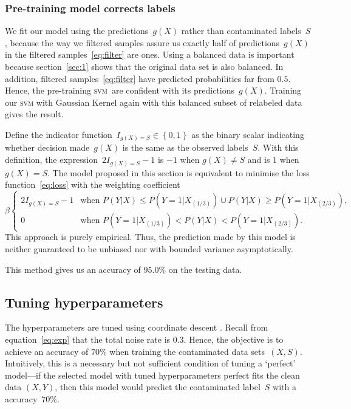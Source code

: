\documentclass[12pt]{article} %
\newcommand{\svm}{\textsc{svm}}
\begin{document}
\subsubsection{Pre-training model corrects labels}
We fit our model using the predictions~$g(X)$ rather than contaminated labels~$S$, because the way we filtered samples  assure us exactly half of predictions~$g(X)$ in the filtered samples~\eqref{eq:filter}  are ones.
Using a balanced data is important because section~\ref{sec:1} shows that the original data set is also balanced. In addition, filtered samples~\eqref{eq:filter} have  predicted probabilities far from $0.5$. Hence, the pre-training \svm\ are confident with its predictions~$g(X)$.
Training our \textsc{svm} with Gaussian Kernel again with this balanced subset of relabeled data gives the result.

Define the indicator function~$I_{g(X)=S} \in \left\{0,1\right\}$ as the binary scalar indicating whether decision made~$g(X)$ is the same as the observed labels~$S$. With this definition, the expression~$2I_{g(X)=S}-1$ is $-1$ when $g(X)\neq S$ and is $1$ when $g(X)=S$.  The model proposed in this section is equivalent to minimise the loss function~\eqref{eq:loss} with the weighting coefficient
\begin{equation*}
\beta\begin{cases}
2I_{g(X)=S}-1 & \text{when }P({Y}|X)\leq P(Y=1|X_{(1/3)}) \cup P({Y}|X)\geq P(Y=1|X_{(2/3)}),\\
0 & \text{when }P(Y=1|X_{(1/3)})<P({Y}|X)<P(Y=1|X_{(2/3)}).
\end{cases}
\end{equation*}
This approach is purely empirical. Thus, the prediction made by this model is neither guaranteed to be unbiased nor with bounded variance asymptotically.

This method gives us an accuracy of $95.0\%$ on the testing data.


\subsection{Tuning hyperparameters}
The hyperparameters are tuned using coordinate descent \citep{hastie01statisticallearning}. Recall from equation~\eqref{eq:exp} that the total noise rate is 0.3. Hence,  the objective is to achieve an accuracy of $70\%$ when training the contaminated data sets~$(X,S)$. Intuitively, this is a necessary but not sufficient condition of tuning a `perfect' model---if the selected model with tuned hyperparameters perfect fits the clean data $(X,Y)$, then this model would predict the contaminated label~$S$ with a accuracy~$70\%$.
\end{document}
